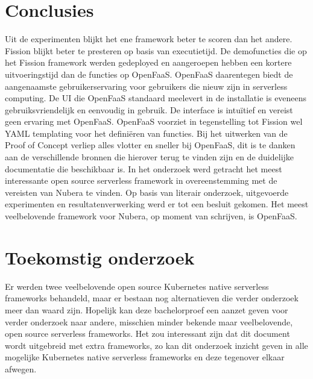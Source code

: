 \documentclass[a0,portrait]{a0poster}
\begin{document}
\begin{multicols}{2}



\color{HoGentAccent1} 
\section*{Conclusies}
\color{black}
Uit de experimenten blijkt het ene framework beter te scoren dan het andere. Fission blijkt beter te presteren op basis van executietijd. De demofuncties die op het Fission framework werden gedeployed en aangeroepen hebben een kortere uitvoeringstijd dan de functies op OpenFaaS. OpenFaaS daarentegen biedt de aangenaamste gebruikerservaring voor gebruikers die nieuw zijn in serverless computing. De UI die OpenFaaS standaard meelevert in de installatie is eveneens gebruiksvriendelijk en eenvoudig in gebruik. De interface is intuïtief en vereist geen ervaring met OpenFaaS. OpenFaaS voorziet in tegenstelling tot Fission wel YAML templating voor het definiëren van functies. Bij het uitwerken van de Proof of Concept verliep alles vlotter en sneller bij OpenFaaS, dit is te danken aan de verschillende bronnen die hierover terug te vinden zijn en de duidelijke documentatie die beschikbaar is. In het onderzoek werd getracht het meest interessante open source serverless framework in overeenstemming met de vereisten van Nubera te vinden. Op basis van literair onderzoek, uitgevoerde experimenten en resultatenverwerking werd er tot een besluit gekomen. Het meest veelbelovende framework voor Nubera, op moment van schrijven, is OpenFaaS.

\color{HoGentAccent1} 
\section*{Toekomstig onderzoek}
\color{black}
Er werden twee veelbelovende open source Kubernetes native serverless frameworks behandeld, maar er bestaan nog alternatieven die verder onderzoek meer dan waard zijn. Hopelijk kan deze bachelorproef een aanzet geven voor verder onderzoek naar andere, misschien minder bekende maar veelbelovende, open source serverless frameworks. Het zou interessant zijn dat dit document wordt uitgebreid met extra frameworks, zo kan dit onderzoek inzicht geven in alle mogelijke Kubernetes native serverless frameworks en deze tegenover elkaar afwegen.
\end{multicols}
\end{document}
